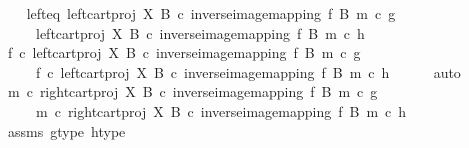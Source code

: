 \begin{isabellebody}
\ \ \isamarkupfalse%
\ left{\isacharunderscore}{\kern0pt}eq{\isacharcolon}{\kern0pt}\ {\isachardoublequoteopen}{\isacharparenleft}{\kern0pt}left{\isacharunderscore}{\kern0pt}cart{\isacharunderscore}{\kern0pt}proj\ X\ B\ {\isasymcirc}\isactrlsub c\ inverse{\isacharunderscore}{\kern0pt}image{\isacharunderscore}{\kern0pt}mapping\ f\ B\ m{\isacharparenright}{\kern0pt}\ {\isasymcirc}\isactrlsub c\ g\isanewline
\ \ \ \ {\isacharequal}{\kern0pt}\ {\isacharparenleft}{\kern0pt}left{\isacharunderscore}{\kern0pt}cart{\isacharunderscore}{\kern0pt}proj\ X\ B\ {\isasymcirc}\isactrlsub c\ inverse{\isacharunderscore}{\kern0pt}image{\isacharunderscore}{\kern0pt}mapping\ f\ B\ m{\isacharparenright}{\kern0pt}\ {\isasymcirc}\isactrlsub c\ h{\isachardoublequoteclose}\isanewline
\ \ \isamarkupfalse%
\ \isamarkupfalse%
\ {\isachardoublequoteopen}f\ {\isasymcirc}\isactrlsub c\ {\isacharparenleft}{\kern0pt}left{\isacharunderscore}{\kern0pt}cart{\isacharunderscore}{\kern0pt}proj\ X\ B\ {\isasymcirc}\isactrlsub c\ inverse{\isacharunderscore}{\kern0pt}image{\isacharunderscore}{\kern0pt}mapping\ f\ B\ m{\isacharparenright}{\kern0pt}\ {\isasymcirc}\isactrlsub c\ g\isanewline
\ \ \ \ {\isacharequal}{\kern0pt}\ f\ {\isasymcirc}\isactrlsub c\ {\isacharparenleft}{\kern0pt}left{\isacharunderscore}{\kern0pt}cart{\isacharunderscore}{\kern0pt}proj\ X\ B\ {\isasymcirc}\isactrlsub c\ inverse{\isacharunderscore}{\kern0pt}image{\isacharunderscore}{\kern0pt}mapping\ f\ B\ m{\isacharparenright}{\kern0pt}\ {\isasymcirc}\isactrlsub c\ h{\isachardoublequoteclose}\isanewline
\ \ \ \ \isamarkupfalse%
\ auto\isanewline
\ \ \isamarkupfalse%
\ \isamarkupfalse%
\ {\isachardoublequoteopen}m\ {\isasymcirc}\isactrlsub c\ {\isacharparenleft}{\kern0pt}right{\isacharunderscore}{\kern0pt}cart{\isacharunderscore}{\kern0pt}proj\ X\ B\ {\isasymcirc}\isactrlsub c\ inverse{\isacharunderscore}{\kern0pt}image{\isacharunderscore}{\kern0pt}mapping\ f\ B\ m{\isacharparenright}{\kern0pt}\ {\isasymcirc}\isactrlsub c\ g\isanewline
\ \ \ \ {\isacharequal}{\kern0pt}\ m\ {\isasymcirc}\isactrlsub c\ {\isacharparenleft}{\kern0pt}right{\isacharunderscore}{\kern0pt}cart{\isacharunderscore}{\kern0pt}proj\ X\ B\ {\isasymcirc}\isactrlsub c\ inverse{\isacharunderscore}{\kern0pt}image{\isacharunderscore}{\kern0pt}mapping\ f\ B\ m{\isacharparenright}{\kern0pt}\ {\isasymcirc}\isactrlsub c\ h{\isachardoublequoteclose}\isanewline
\ \ \ \ \isamarkupfalse%
\ assms\ g{\isacharunderscore}{\kern0pt}type\ h{\isacharunderscore}{\kern0pt}type\isanewline

\end{isabellebody}
